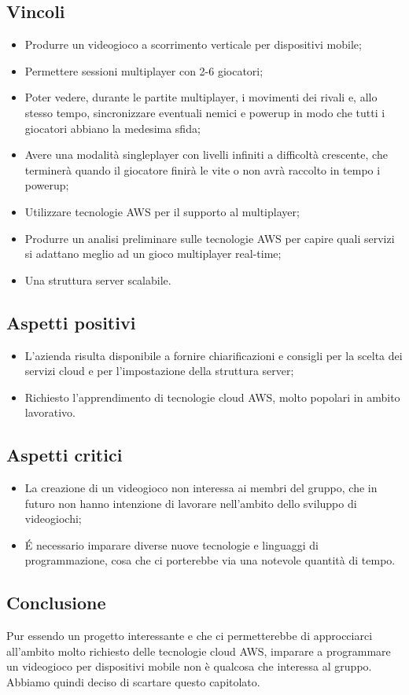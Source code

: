 \subsection{Vincoli}
\begin{itemize}
\item Produrre un videogioco a scorrimento verticale per dispositivi mobile;
\item Permettere sessioni multiplayer con 2-6 giocatori;
\item Poter vedere, durante le partite multiplayer, i movimenti dei rivali e, allo stesso tempo, sincronizzare eventuali nemici e powerup in modo che tutti i giocatori abbiano la medesima sfida;
\item Avere una modalità singleplayer con livelli infiniti a difficoltà crescente, che terminerà quando il giocatore finirà le vite o non avrà raccolto in tempo i powerup;
\item Utilizzare tecnologie AWS per il supporto al multiplayer;
\item Produrre un analisi preliminare sulle tecnologie AWS per capire quali servizi si adattano meglio ad un gioco multiplayer real-time;
\item Una struttura server scalabile.
\end{itemize}

\subsection{Aspetti positivi}
\begin{itemize}
\item L'azienda risulta disponibile a fornire chiarificazioni e consigli per la scelta dei servizi cloud e per l'impostazione della struttura server;
\item Richiesto l'apprendimento di tecnologie cloud AWS, molto popolari in ambito lavorativo.
\end{itemize}

\subsection{Aspetti critici}
\begin{itemize}
\item La creazione di un videogioco non interessa ai membri del gruppo, che in futuro non hanno intenzione di lavorare nell'ambito dello sviluppo di videogiochi;
\item É necessario imparare diverse nuove tecnologie e linguaggi di programmazione, cosa che ci porterebbe via una notevole quantità di tempo.
\end{itemize}

\subsection{Conclusione}
Pur essendo un progetto interessante e che ci permetterebbe di approcciarci all'ambito molto richiesto delle tecnologie cloud AWS, imparare a programmare un videogioco per dispositivi mobile non è qualcosa che interessa al gruppo. Abbiamo quindi deciso di scartare questo capitolato.